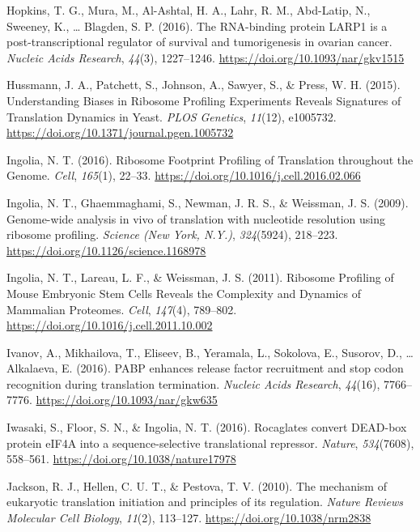 \documentclass[12pt,openany]{book}
\begin{document}
\hypertarget{ref-Hopkins2016}{}
Hopkins, T. G., Mura, M., Al-Ashtal, H. A., Lahr, R. M., Abd-Latip, N.,
Sweeney, K., \ldots{} Blagden, S. P. (2016). The RNA-binding protein
LARP1 is a post-transcriptional regulator of survival and tumorigenesis
in ovarian cancer. \emph{Nucleic Acids Research}, \emph{44}(3),
1227--1246. \url{https://doi.org/10.1093/nar/gkv1515}

\hypertarget{ref-Hussmann2015}{}
Hussmann, J. A., Patchett, S., Johnson, A., Sawyer, S., \& Press, W. H.
(2015). Understanding Biases in Ribosome Profiling Experiments Reveals
Signatures of Translation Dynamics in Yeast. \emph{PLOS Genetics},
\emph{11}(12), e1005732.
\url{https://doi.org/10.1371/journal.pgen.1005732}

\hypertarget{ref-Ingolia2016}{}
Ingolia, N. T. (2016). Ribosome Footprint Profiling of Translation
throughout the Genome. \emph{Cell}, \emph{165}(1), 22--33.
\url{https://doi.org/10.1016/j.cell.2016.02.066}

\hypertarget{ref-Ingolia2009}{}
Ingolia, N. T., Ghaemmaghami, S., Newman, J. R. S., \& Weissman, J. S.
(2009). Genome-wide analysis in vivo of translation with nucleotide
resolution using ribosome profiling. \emph{Science (New York, N.Y.)},
\emph{324}(5924), 218--223.
\url{https://doi.org/10.1126/science.1168978}

\hypertarget{ref-Ingolia2011}{}
Ingolia, N. T., Lareau, L. F., \& Weissman, J. S. (2011). Ribosome
Profiling of Mouse Embryonic Stem Cells Reveals the Complexity and
Dynamics of Mammalian Proteomes. \emph{Cell}, \emph{147}(4), 789--802.
\url{https://doi.org/10.1016/j.cell.2011.10.002}

\hypertarget{ref-Ivanov2016}{}
Ivanov, A., Mikhailova, T., Eliseev, B., Yeramala, L., Sokolova, E.,
Susorov, D., \ldots{} Alkalaeva, E. (2016). PABP enhances release factor
recruitment and stop codon recognition during translation termination.
\emph{Nucleic Acids Research}, \emph{44}(16), 7766--7776.
\url{https://doi.org/10.1093/nar/gkw635}

\hypertarget{ref-Iwasaki2016}{}
Iwasaki, S., Floor, S. N., \& Ingolia, N. T. (2016). Rocaglates convert
DEAD-box protein eIF4A into a sequence-selective translational
repressor. \emph{Nature}, \emph{534}(7608), 558--561.
\url{https://doi.org/10.1038/nature17978}

\hypertarget{ref-Jackson2010}{}
Jackson, R. J., Hellen, C. U. T., \& Pestova, T. V. (2010). The
mechanism of eukaryotic translation initiation and principles of its
regulation. \emph{Nature Reviews Molecular Cell Biology}, \emph{11}(2),
113--127. \url{https://doi.org/10.1038/nrm2838}
\end{document}
